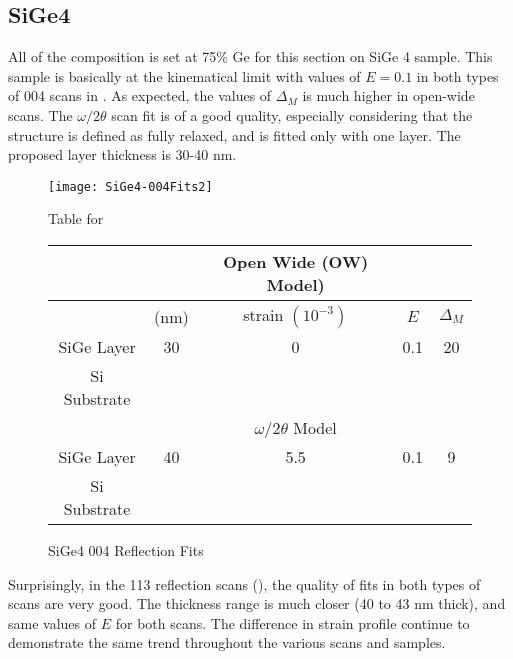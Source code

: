 \subsection{SiGe4}


All of the composition is set at 75\% Ge for this section on SiGe 4 sample.  This sample is basically at the kinematical limit with values of $E=0.1$ in both types of 004 scans in .  As expected, the values of $\Delta_M$ is much higher in open-wide scans.  The $\omega/2\theta$ scan fit  is of a good quality, especially considering that the structure is defined as fully relaxed, and is fitted only with one layer.  The proposed layer thickness is 30-40 nm.

\begin{figure}[hc]%
\caption{SiGe4 004 Reflection Fits}
\label{SiGe4-004}
\begin{minipage}{0.85\linewidth}
\texttt{[image: SiGe4-004Fits2]}
\end{minipage}
\begin{minipage}{\linewidth}
\centering
\vspace{10pt}
Table for \\
\vspace{5pt}
\begin{tabular}{c|cccc}
			& 	&Open Wide (OW) Model)	 \\
\hline
			&	(nm)	&	strain	 $(10^{-3})$&	$E$ &  $\Delta_M$\\
\hline
SiGe Layer		&  	30	&     0	 &0.1 & 20 	\\
Si Substrate		&	\textemdash & \textemdash&\textemdash\ &\textemdash	\\
\hline
			& &$\omega/2\theta$ Model \\
\hline
SiGe Layer		&	40	& 5.5	&0.1	&9 	\\
Si Substrate		&	\textemdash & \textemdash&\textemdash\ &\textemdash
\end{tabular}
\end{minipage}
\end{figure}

Surprisingly, in the 113 reflection scans (), the quality of fits in both types of scans are very good.  The thickness range is much closer (40 to 43 nm thick), and same values of $E$ for both scans.  The difference in strain profile continue to demonstrate the same trend throughout the various scans and samples.

